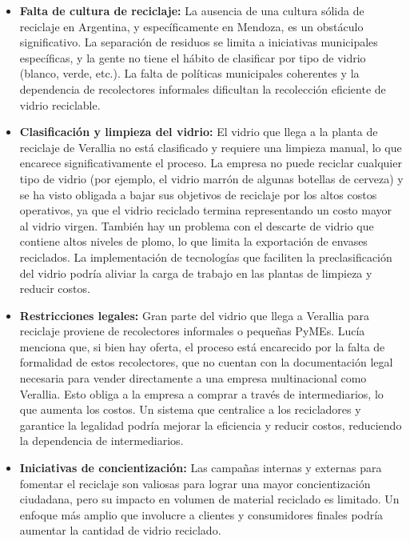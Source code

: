 \begin{itemize}
		\item \textbf{Falta de cultura de reciclaje:} La ausencia de una cultura sólida de reciclaje en Argentina, y específicamente en Mendoza, es un obstáculo significativo. La separación de residuos se limita a iniciativas municipales específicas, y la gente no tiene el hábito de clasificar por tipo de vidrio (blanco, verde, etc.). La falta de políticas municipales coherentes y la dependencia de recolectores informales dificultan la recolección eficiente de vidrio reciclable.

		\item \textbf{Clasificación y limpieza del vidrio:} El vidrio que llega a la planta de reciclaje de Verallia no está clasificado y requiere una limpieza manual, lo que encarece significativamente el proceso. La empresa no puede reciclar cualquier tipo de vidrio (por ejemplo, el vidrio marrón de algunas botellas de cerveza) y se ha visto obligada a bajar sus objetivos de reciclaje por los altos costos operativos, ya que el vidrio reciclado termina representando un costo mayor al vidrio virgen. También hay un problema con el descarte de vidrio que contiene altos niveles de plomo, lo que limita la exportación de envases reciclados. La implementación de tecnologías que faciliten la preclasificación del vidrio podría aliviar la carga de trabajo en las plantas de limpieza y reducir costos.

		\item \textbf{Restricciones legales:} Gran parte del vidrio que llega a Verallia para reciclaje proviene de recolectores informales o pequeñas PyMEs. Lucía menciona que, si bien hay oferta, el proceso está encarecido por la falta de formalidad de estos recolectores, que no cuentan con la documentación legal necesaria para vender directamente a una empresa multinacional como Verallia. Esto obliga a la empresa a comprar a través de intermediarios, lo que aumenta los costos. Un sistema que centralice a los recicladores y garantice la legalidad podría mejorar la eficiencia y reducir costos, reduciendo la dependencia de intermediarios.

		\item \textbf{Iniciativas de concientización:} Las campañas internas y externas para fomentar el reciclaje son valiosas para lograr una mayor concientización ciudadana, pero su impacto en volumen de material reciclado es limitado. Un enfoque más amplio que involucre a clientes y consumidores finales podría aumentar la cantidad de vidrio reciclado.
		

\end{itemize}
